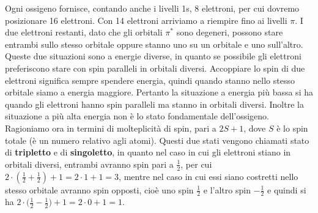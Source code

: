 Ogni ossigeno fornisce, contando anche i livelli 1s, 8 elettroni, per cui dovremo posizionare 16 elettroni. Con 14 elettroni arriviamo a riempire fino ai livelli $\pi$. I due elettroni restanti, dato che gli orbitali $\pi^*$ sono degeneri, possono stare entrambi sullo stesso orbitale oppure stanno uno su un orbitale e uno sull'altro. Queste due situazioni sono a energie diverse, in quanto se possibile gli elettroni preferiscono stare con spin paralleli in orbitali diversi. Accoppiare lo spin di due elettroni significa sempre spendere energia, quindi quando stanno nello stesso orbitale siamo a energia maggiore. Pertanto la situazione a energia più bassa si ha quando gli elettroni hanno spin paralleli ma stanno in orbitali diversi. Inoltre la situazione a più alta energia non è lo stato fondamentale dell'ossigeno.
\newpage
Ragioniamo ora in termini di molteplicità di spin, pari a $2S + 1$, dove $S$ è lo spin totale (è un numero relativo agli atomi). Questi due stati vengono chiamati stato di \textbf{tripletto} e di \textbf{singoletto}, in quanto nel caso in cui gli elettroni stiano in orbitali diversi, entrambi avranno spin pari a $\frac{1}{2}$, per cui $2 \cdot (\frac{1}{2} + \frac{1}{2})+1=2 \cdot 1 + 1=3$, mentre nel caso in cui essi siano costretti nello stesso orbitale avranno spin opposti, cioè uno spin $\frac{1}{2}$ e l'altro spin $-\frac{1}{2}$ e quindi si ha $2 \cdot \big(\frac{1}{2} - \frac{1}{2}\big) + 1= 2 \cdot 0 + 1=1$.
